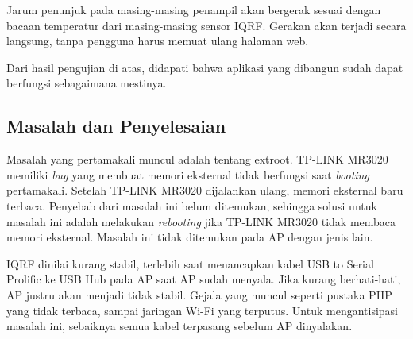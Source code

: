 			Jarum penunjuk pada masing-masing penampil akan bergerak sesuai dengan bacaan temperatur dari masing-masing sensor IQRF. Gerakan akan terjadi secara langsung, tanpa pengguna harus memuat ulang halaman web.
			
			Dari hasil pengujian di atas, didapati bahwa aplikasi yang dibangun sudah dapat berfungsi sebagaimana mestinya.

		\subsection{Masalah dan Penyelesaian}
			Masalah yang pertamakali muncul adalah tentang extroot. TP-LINK MR3020 memiliki \emph{bug} yang membuat memori eksternal tidak berfungsi saat \emph{booting} pertamakali. Setelah TP-LINK MR3020 dijalankan ulang, memori eksternal baru terbaca. Penyebab dari masalah ini belum ditemukan, sehingga solusi untuk masalah ini adalah melakukan \emph{rebooting} jika TP-LINK MR3020 tidak membaca memori eksternal. Masalah ini tidak ditemukan pada AP dengan jenis lain.

			
			IQRF dinilai kurang stabil, terlebih saat menancapkan kabel USB to Serial Prolific ke USB Hub pada AP saat AP sudah menyala. Jika kurang berhati-hati, AP justru akan menjadi tidak stabil. Gejala yang muncul seperti pustaka PHP yang tidak terbaca, sampai jaringan Wi-Fi yang terputus. Untuk mengantisipasi masalah ini, sebaiknya semua kabel terpasang sebelum AP dinyalakan.
			

